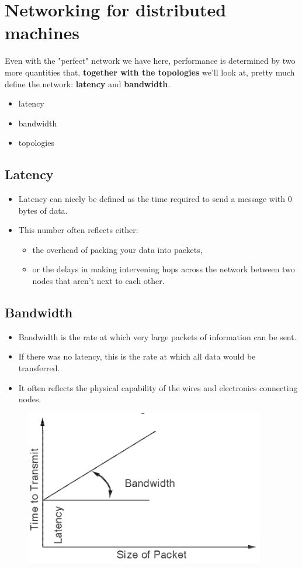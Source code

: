 \documentclass[12pt, a4paper]{book}
\begin{document}
\section{Networking for distributed machines}
Even with the "perfect" network we have here, performance is determined by two more quantities
that, \textbf{together with the topologies} we'll look at, pretty much define the network: \textbf{latency} and
\textbf{bandwidth}.

\begin{itemize}
    \item latency
    \item bandwidth
    \item topologies
\end{itemize}
\subsection{Latency}
\begin{itemize}
    \item Latency can nicely be defined as the time required to send a message with 0 bytes of data.
    \item This number often reflects either: \begin{itemize}
              \item the overhead of packing your data into packets,
              \item or the delays in making intervening hops across the network between two nodes that aren't next to each other.
          \end{itemize}
\end{itemize}
\subsection{Bandwidth}
\begin{itemize}
    \item Bandwidth is the rate at which very large packets of information can be sent.
    \item If there was no latency, this is the rate at which all data would be transferred.
    \item It often reflects the physical capability of the wires and electronics connecting nodes.
\end{itemize}
\begin{figure}[!h]
    \centering
    \includegraphics[width=0.5\linewidth]{figures/Latency and Bandwidth.png}
\end{figure}
\end{document}
